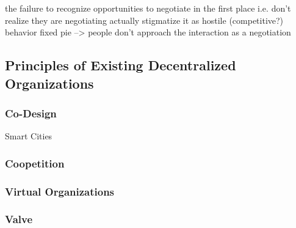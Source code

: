             
    the failure to recognize opportunities to negotiate in the first place
        i.e. don't realize they are negotiating
        actually stigmatize it as hostile (competitive?) behavior
        fixed pie --> people don't approach the interaction as a negotiation
    
    
    

\subsection{Principles of Existing Decentralized Organizations}

\subsubsection{Co-Design}
Smart Cities

\subsubsection{Coopetition}

\subsubsection{Virtual Organizations}

\subsubsection{Valve}